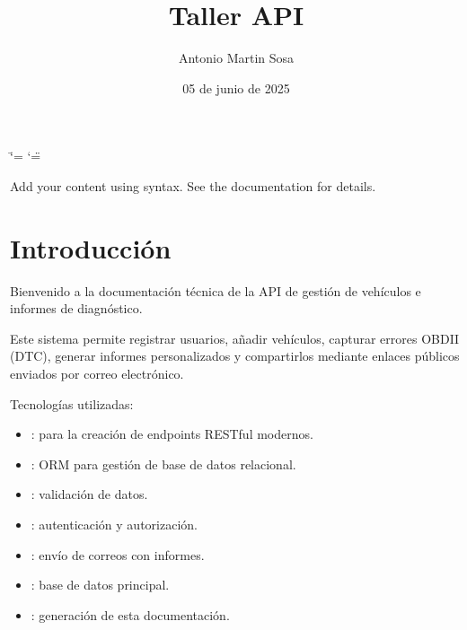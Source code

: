 \documentclass[letterpaper,10pt,spanish]{sphinxmanual}
\title{Taller API}
\date{05 de junio de 2025}
\author{Antonio Martin Sosa}
\begin{document}
\ifdefined\shorthandoff
  \ifnum\catcode`\=\string=\active\shorthandoff{=}\fi
  \ifnum\catcode`\"=\active{}\fi
\fi

\pagestyle{empty}
\sphinxmaketitle
\pagestyle{plain}
\sphinxtableofcontents
\pagestyle{normal}
\label{\detokenize{index::doc}}


\sphinxAtStartPar
Add your content using  syntax. See the
documentation for details.

\sphinxstepscope


\chapter{Introducción}
\label{\detokenize{introduccion:introduccion}}\label{\detokenize{introduccion::doc}}
\sphinxAtStartPar
Bienvenido a la documentación técnica de la API de gestión de vehículos e informes de diagnóstico.

\sphinxAtStartPar
Este sistema permite registrar usuarios, añadir vehículos, capturar errores OBD\sphinxhyphen{}II (DTC), generar informes personalizados y compartirlos mediante enlaces públicos enviados por correo electrónico.

\sphinxAtStartPar
Tecnologías utilizadas:
\begin{itemize}
\item {} 
\sphinxAtStartPar
{}: para la creación de endpoints RESTful modernos.

\item {} 
\sphinxAtStartPar
{}: ORM para gestión de base de datos relacional.

\item {} 
\sphinxAtStartPar
{}: validación de datos.

\item {} 
\sphinxAtStartPar
{}: autenticación y autorización.

\item {} 
\sphinxAtStartPar
{}: envío de correos con informes.

\item {} 
\sphinxAtStartPar
{}: base de datos principal.

\item {} 
\sphinxAtStartPar
{}: generación de esta documentación.

\end{itemize}
\end{document}
